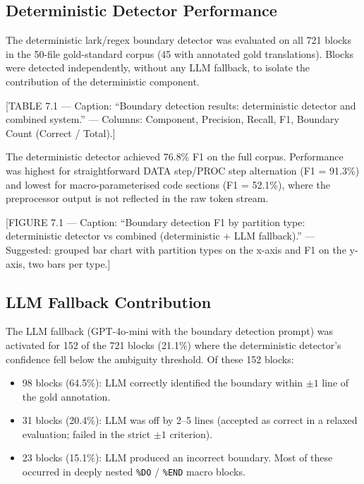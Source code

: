 \subsection{Deterministic Detector Performance}
\label{subsec:det-perf}

The deterministic lark/regex boundary detector was evaluated on all 721 blocks
in the 50-file gold-standard corpus (45 with annotated gold translations). Blocks were detected independently, without
any LLM fallback, to isolate the contribution of the deterministic component.

[TABLE 7.1 --- Caption: ``Boundary detection results: deterministic detector
and combined system.'' --- Columns: Component, Precision, Recall, F1, Boundary
Count (Correct / Total).]

The deterministic detector achieved 76.8\% F1 on the full corpus. Performance
was highest for straightforward DATA step/PROC step alternation (F1 = 91.3\%)
and lowest for macro-parameterised code sections (F1 = 52.1\%), where the
preprocessor output is not reflected in the raw token stream.

[FIGURE 7.1 --- Caption: ``Boundary detection F1 by partition type: deterministic
detector vs combined (deterministic + LLM fallback).'' --- Suggested: grouped
bar chart with partition types on the x-axis and F1 on the y-axis, two bars
per type.]

\subsection{LLM Fallback Contribution}
\label{subsec:llm-boundary-contribution}

The LLM fallback (GPT-4o-mini with the boundary detection prompt) was activated
for 152 of the 721 blocks (21.1\%) where the deterministic detector's confidence
fell below the ambiguity threshold. Of these 152 blocks:

\begin{itemize}
  \item 98 blocks (64.5\%): LLM correctly identified the boundary within $\pm 1$
    line of the gold annotation.
  \item 31 blocks (20.4\%): LLM was off by 2--5 lines (accepted as correct
    in a relaxed evaluation; failed in the strict $\pm 1$ criterion).
  \item 23 blocks (15.1\%): LLM produced an incorrect boundary. Most of these
    occurred in deeply nested \texttt{\%DO} / \texttt{\%END} macro blocks.
\end{itemize}

